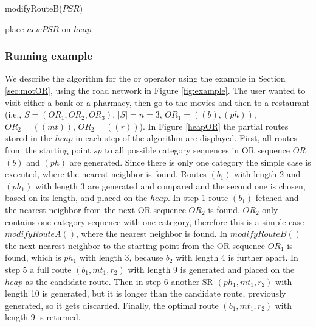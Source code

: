 \enlargethispage{\baselineskip}

\begin{procedure}[H]
\caption{modifyRouteB($PSR$)}
\label{proc:modifyRouteB}
	
	
	
	place $newPSR$ on $heap$\;
\end{procedure}

\subsubsection{Running example}
We describe the algorithm for the or operator using the example in Section \ref{sec:motOR}, using the road network in Figure \ref{fig:example}. The user wanted to visit either a bank or a pharmacy, then go to the movies and then to a restaurant (i.e., $S = (OR_1, OR_2, OR_3)$, $|S| = n = 3$, $OR_1 = ((b), (ph))$, $OR_2 = ((mt))$, $OR_2 = ((r))$). In Figure \ref{heapOR} the partial routes stored in the $heap$ in each step of the algorithm are displayed.
First, all routes from the starting point $sp$ to all possible category sequences in OR sequence $OR_1$ $(b)$ and $(ph)$ are generated. Since there is only one category the simple case is executed, where the nearest neighbor is found. Routes $(b_1)$ with length 2 and $(ph_1)$ with length 3 are generated and compared and the second one is chosen, based on its length, and placed on the $heap$. In step 1 route $(b_1)$ fetched and the nearest neighbor from the next OR sequence $OR_2$ is found. $OR_2$ only contains one category sequence with one category, therefore this is a simple case $modifyRouteA()$, where the nearest neighbor is found. In $modifyRouteB()$ the next nearest neighbor to the starting point from the OR sequence $OR_1$ is found, which is $ph_1$ with length 3, because $b_2$ with length 4 is further apart. 
In step 5 a full route $(b_1, mt_1, r_2)$ with length 9 is generated and placed on the $heap$ as the candidate route. Then in step 6 another SR $(ph_1, mt_1, r_2)$ with length 10 is generated, but it is longer than the candidate route, previously generated, so it gets discarded. Finally, the optimal route $(b_1, mt_1, r_2)$ with length 9 is returned.


